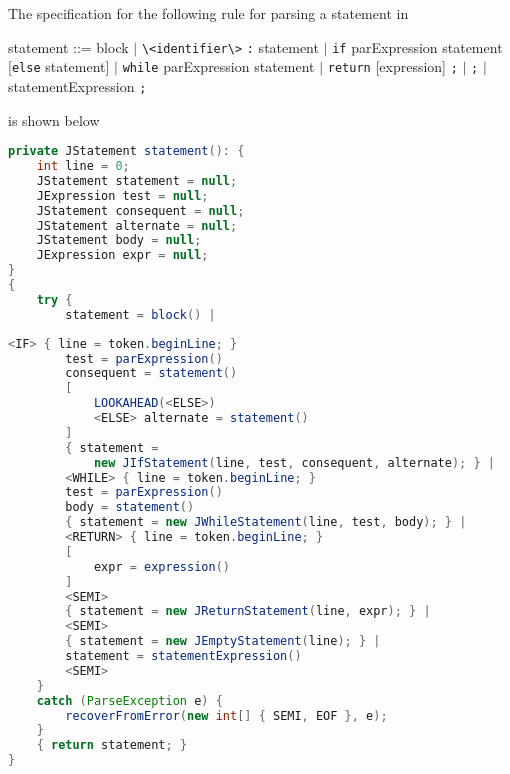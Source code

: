 \documentclass[8pt,a4paper,compress,handout]{beamer}
\newcommand{\mm}[1]{$#1$}
\newenvironment{spaced}
{
\smallskip
\hspace{.5cm}
\begin{minipage}[c]{\textwidth}
}
{
\end{minipage}
\smallskip
}
\begin{document}
\begin{frame}[fragile]
\pause

The specification for the following rule for parsing a statement in \jmm

\text{ }
\begin{spaced}
\begin{production}
statement ::= block
                  \mm{|} \lstinline{\<identifier\>} \lstinline{:} statement
                  \mm{|} \lstinline{if} parExpression statement [\lstinline{else} statement]
                  \mm{|} \lstinline{while} parExpression statement
                  \mm{|} \lstinline{return} [expression] \lstinline{;}
                  \mm{|} \lstinline{;}
                  \mm{|} statementExpression \lstinline{;}
\end{production}
\end{spaced}

\noindent is shown below

\begin{lstlisting}[language=Java]
private JStatement statement(): {
    int line = 0;
    JStatement statement = null;
    JExpression test = null;
    JStatement consequent = null;
    JStatement alternate = null;
    JStatement body = null;
    JExpression expr = null;
}
{
    try {
        statement = block() |
\end{lstlisting}
\end{frame}

\begin{frame}[fragile]
\pause

\begin{lstlisting}[language=Java]
        <IF> { line = token.beginLine; }
        test = parExpression()
        consequent = statement()
        [
            LOOKAHEAD(<ELSE>)
            <ELSE> alternate = statement()
        ]
        { statement =
            new JIfStatement(line, test, consequent, alternate); } |
        <WHILE> { line = token.beginLine; }
        test = parExpression()
        body = statement()
        { statement = new JWhileStatement(line, test, body); } |
        <RETURN> { line = token.beginLine; }
        [
            expr = expression()
        ]
        <SEMI>
        { statement = new JReturnStatement(line, expr); } |
        <SEMI>
        { statement = new JEmptyStatement(line); } |
        statement = statementExpression()
        <SEMI>
    }
    catch (ParseException e) {
        recoverFromError(new int[] { SEMI, EOF }, e);
    }
    { return statement; }
}
\end{lstlisting}
\end{frame}
\end{document}
